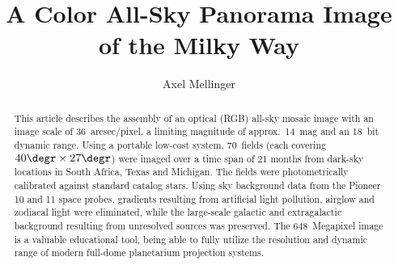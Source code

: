 \documentclass[preprint]{aastex}
\begin{document}

\title{A Color All-Sky Panorama Image of the Milky Way}


\author{Axel Mellinger}







\begin{abstract}
This article describes the assembly of an optical (RGB) all-sky mosaic image with an image scale of 36~arcsec/pixel, a limiting magnitude of approx.\ 14~mag and an 18~bit dynamic range. Using a portable low-cost system, 70~fields (each covering $40\degr\times 27\degr$) were imaged over a time span of 21 months from dark-sky locations in South Africa, Texas and Michigan. The fields were photometrically calibrated against standard catalog stars.  Using sky background data from the Pioneer 10 and 11 space probes, gradients resulting from artificial light pollution, airglow and zodiacal light were eliminated, while the large-scale galactic and extragalactic background resulting from unresolved sources was preserved. The 648~Megapixel image is a valuable educational tool, being able to fully utilize the resolution and dynamic range of modern full-dome planetarium projection systems. 
\end{abstract}
\end{document}
